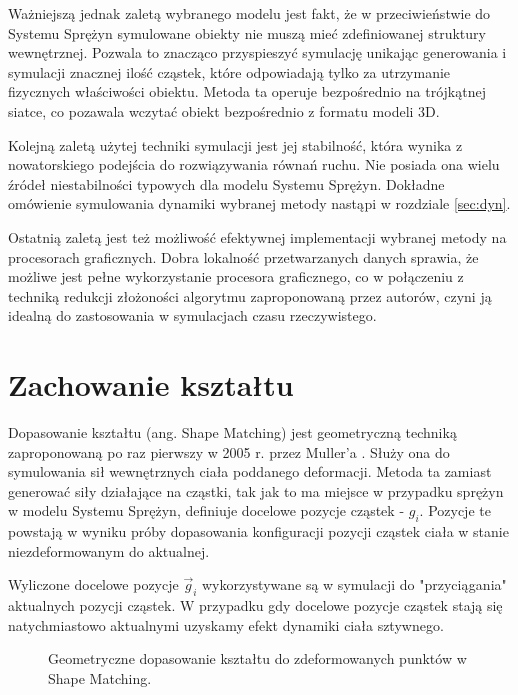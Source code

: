 Ważniejszą jednak zaletą wybranego modelu jest fakt, że w przeciwieństwie do
Systemu Sprężyn symulowane obiekty nie muszą mieć
zdefiniowanej struktury wewnętrznej. Pozwala to znacząco przyspieszyć symulację
unikając generowania i symulacji znacznej ilość cząstek, które odpowiadają tylko za
utrzymanie fizycznych właściwości obiektu. Metoda ta operuje bezpośrednio na
trójkątnej siatce, co pozawala wczytać obiekt bezpośrednio z formatu modeli
3D.

Kolejną zaletą użytej techniki symulacji jest jej stabilność, która wynika z
nowatorskiego podejścia do rozwiązywania równań ruchu. Nie posiada ona
wielu źródeł niestabilności typowych dla modelu Systemu Sprężyn.
Dokładne omówienie symulowania dynamiki wybranej metody nastąpi w rozdziale
\ref{sec:dyn}.

Ostatnią zaletą jest też możliwość efektywnej implementacji wybranej metody na
procesorach graficznych. Dobra lokalność przetwarzanych danych sprawia, że
możliwe jest pełne wykorzystanie procesora graficznego, co w połączeniu z
techniką redukcji złożoności algorytmu zaproponowaną przez autorów, czyni ją
idealną do zastosowania w symulacjach czasu rzeczywistego.

\section{Zachowanie kształtu}
\label{sec:shape}
Dopasowanie kształtu (ang. Shape Matching) jest geometryczną techniką
zaproponowaną po raz pierwszy w 2005 r. przez Muller'a \cite{shape}. Służy ona do
symulowania sił wewnętrznych ciała poddanego deformacji. Metoda ta zamiast
generować siły działające na cząstki, tak jak to ma miejsce w przypadku
sprężyn w modelu Systemu Sprężyn, definiuje docelowe pozycje cząstek - $g_i$.
Pozycje te powstają w wyniku próby dopasowania konfiguracji 
pozycji cząstek ciała w stanie niezdeformowanym do aktualnej.

Wyliczone docelowe pozycje $\vec{g}_i$ wykorzystywane są w symulacji do "przyciągania"
aktualnych pozycji cząstek. W przypadku gdy docelowe pozycje cząstek stają się
natychmiastowo aktualnymi uzyskamy efekt dynamiki ciała sztywnego.

\begin{figure}[ht]
\centering

\caption{Geometryczne dopasowanie kształtu do zdeformowanych punktów w Shape Matching.}
\label{shape-matching}
\end{figure}

